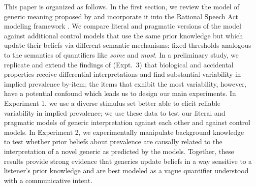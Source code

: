 \documentclass[floatsintext,doc]{apa6}
\begin{document}
This paper is organized as follows.
In the first section, we review the model of generic meaning proposed by  and incorporate it into the Rational Speech Act modeling framework \cite{Frank2012, Goodman2016}.
We compare literal and pragmatic versions of the model against additional control models that use the same prior knowledge but which update their beliefs via different semantic mechanisms: fixed-thresholds analogous to the semantics of quantifiers like \emph{some} and \emph{most}.
In a preliminary study, we replicate and extend the findings of  (Expt.~3) that biological and accidental properties receive differential interpretations and find substantial variability in implied prevalence by-item; the items that exhibit the most variability, however, have a potential confound which leads us to design our main experiments.
In Experiment 1, we use a diverse stimulus set better able to elicit reliable variability in implied prevalence; we use these data to test our literal and pragmatic models of generic interpretation against each other and against control models.
In Experiment 2, we experimentally manipulate background knowledge to test whether prior beliefs about prevalence are causally related to the interpretation of a novel generic as predicted by the models.
Together, these results provide strong evidence that generics update beliefs in a way sensitive to a listener's prior knowledge and are best modeled as a vague quantifier understood with a communicative intent.
\end{document}
